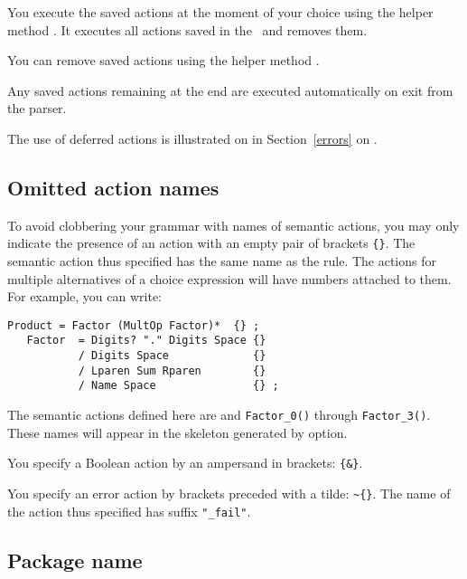 You execute the saved actions at the moment of your choice
using the helper method .
It executes all actions saved in the \Phrase\ and removes them.

You can remove saved actions using the helper method .

Any saved actions remaining at the end are executed automatically 
on exit from the parser.

The use of deferred actions is illustrated on in Section~\ref{errors} on .

\subsection{Omitted action names}

To avoid clobbering your grammar with names of semantic actions, 
you may only indicate the presence of an action with an empty pair of brackets \verb#{}#.
The semantic action thus specified has the same name as the rule.
The actions for multiple alternatives of a choice expression will have numbers attached to them.
For example, you can write:

\small
\begin{Verbatim}[frame=single,framesep=2mm,samepage=true,xleftmargin=15mm,xrightmargin=15mm,baselinestretch=0.8]
   Product = Factor (MultOp Factor)*  {} ;
   Factor  = Digits? "." Digits Space {}
           / Digits Space             {}
           / Lparen Sum Rparen        {} 
           / Name Space               {} ; 
\end{Verbatim}
\normalsize

The semantic actions defined here are
 and \verb#Factor_0()# through \verb#Factor_3()#.
These names will appear in the skeleton generated by  option.

You specify a Boolean action by an ampersand in brackets: \verb#{&}#.

You specify an error action by brackets preceded with a tilde: \verb#~{}#.\newline
The name of the action thus specified has suffix \verb#"_fail"#.

\subsection{Package name}

